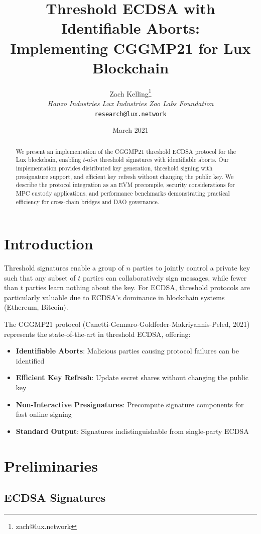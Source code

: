 \documentclass[11pt,a4paper]{article}
\title{\textbf{Threshold ECDSA with Identifiable Aborts: \\Implementing CGGMP21 for Lux Blockchain}}
\author{Zach Kelling\thanks{zach@lux.network} \\ \textit{Hanzo Industries \quad Lux Industries \quad Zoo Labs Foundation} \\ \texttt{research@lux.network}}
\date{March 2021}
\theoremstyle{definition}
\begin{document}
\maketitle

\begin{abstract}
We present an implementation of the CGGMP21 threshold ECDSA protocol for the Lux blockchain, enabling $t$-of-$n$ threshold signatures with identifiable aborts. Our implementation provides distributed key generation, threshold signing with presignature support, and efficient key refresh without changing the public key. We describe the protocol integration as an EVM precompile, security considerations for MPC custody applications, and performance benchmarks demonstrating practical efficiency for cross-chain bridges and DAO governance.
\end{abstract}

\section{Introduction}

Threshold signatures enable a group of $n$ parties to jointly control a private key such that any subset of $t$ parties can collaboratively sign messages, while fewer than $t$ parties learn nothing about the key. For ECDSA, threshold protocols are particularly valuable due to ECDSA's dominance in blockchain systems (Ethereum, Bitcoin).

The CGGMP21 protocol (Canetti-Gennaro-Goldfeder-Makriyannis-Peled, 2021) represents the state-of-the-art in threshold ECDSA, offering:

\begin{itemize}
\item \textbf{Identifiable Aborts}: Malicious parties causing protocol failures can be identified
\item \textbf{Efficient Key Refresh}: Update secret shares without changing the public key
\item \textbf{Non-Interactive Presignatures}: Precompute signature components for fast online signing
\item \textbf{Standard Output}: Signatures indistinguishable from single-party ECDSA
\end{itemize}

\section{Preliminaries}

\subsection{ECDSA Signatures}
\end{document}
